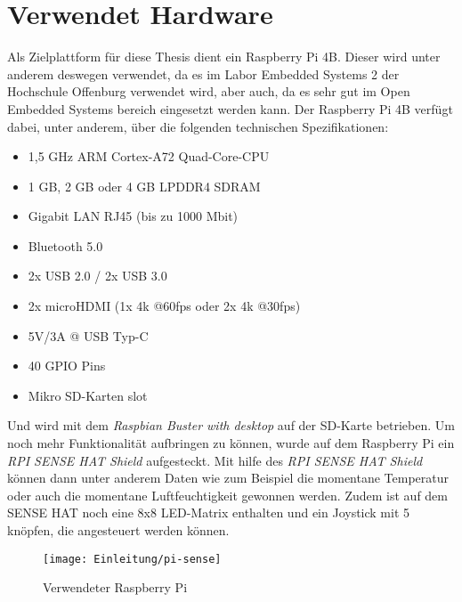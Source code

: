 \section{Verwendet Hardware}
\label{sec:verwendeteHardware}
Als Zielplattform für diese Thesis dient ein Raspberry Pi 4B. Dieser wird unter anderem deswegen
verwendet, da es im Labor Embedded Systems 2 der Hochschule Offenburg verwendet wird, aber auch,
da es sehr gut im Open Embedded Systems bereich eingesetzt werden kann. Der Raspberry Pi 4B
verfügt dabei, unter anderem, über die folgenden technischen Spezifikationen: \cite{RasberryPiSpecs}
\begin{itemize}
    \item 1,5 GHz ARM Cortex-A72 Quad-Core-CPU
    \item 1 GB, 2 GB oder 4 GB LPDDR4 SDRAM
    \item Gigabit LAN RJ45 (bis zu 1000 Mbit)
    \item Bluetooth 5.0
    \item 2x USB 2.0 / 2x USB 3.0
    \item 2x microHDMI (1x 4k @60fps oder 2x 4k @30fps)
    \item 5V/3A @ USB Typ-C
    \item 40 GPIO Pins
    \item Mikro SD-Karten slot
\end{itemize}
Und wird mit dem \emph{Raspbian Buster with desktop} auf der SD-Karte betrieben.
\newline
Um noch mehr Funktionalität aufbringen zu können, wurde auf dem Raspberry Pi ein
\emph{RPI SENSE HAT Shield} aufgesteckt. Mit hilfe des \emph{RPI SENSE HAT Shield} können dann
unter anderem Daten wie zum Beispiel die momentane Temperatur oder auch die momentane
Luftfeuchtigkeit gewonnen werden. Zudem ist auf dem SENSE HAT noch eine 8x8 LED-Matrix enthalten
und ein Joystick mit 5 knöpfen, die angesteuert werden können.
\begin{figure}[h]
    \centering
    \texttt{[image: Einleitung/pi-sense]}
    \caption[Raspberry Pi 4 B]{Verwendeter Raspberry Pi}
    \label{img:piSense}
\end{figure}

